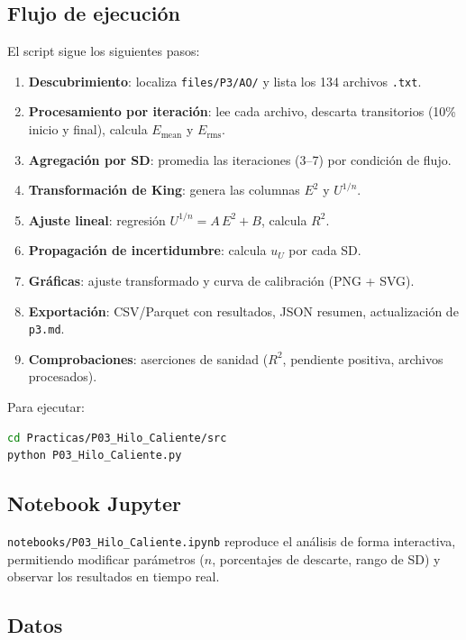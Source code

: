 \documentclass[12pt,a4paper]{article}
\begin{document}
\subsection{Flujo de ejecución}

El script sigue los siguientes pasos:

\begin{enumerate}
	\item \textbf{Descubrimiento}: localiza \texttt{files/P3/AO/} y lista
	      los 134 archivos \texttt{.txt}.
	\item \textbf{Procesamiento por iteración}: lee cada archivo, descarta
	      transitorios (10\% inicio y final), calcula $E_\mathrm{mean}$ y
	      $E_\mathrm{rms}$.
	\item \textbf{Agregación por SD}: promedia las iteraciones (3--7) por
	      condición de flujo.
	\item \textbf{Transformación de King}: genera las columnas $E^2$ y
	      $U^{1/n}$.
	\item \textbf{Ajuste lineal}: regresión $U^{1/n} = A\,E^2 + B$,
	      calcula $R^2$.
	\item \textbf{Propagación de incertidumbre}: calcula $u_U$ por cada SD.
	\item \textbf{Gráficas}: ajuste transformado y curva de calibración
	      (PNG + SVG).
	\item \textbf{Exportación}: CSV/Parquet con resultados, JSON resumen,
	      actualización de \texttt{p3.md}.
	\item \textbf{Comprobaciones}: aserciones de sanidad ($R^2$, pendiente
	      positiva, archivos procesados).
\end{enumerate}

Para ejecutar:
\begin{lstlisting}[language=bash,caption={Ejecución del script HWA.}]
cd Practicas/P03_Hilo_Caliente/src
python P03_Hilo_Caliente.py
\end{lstlisting}

\subsection{Notebook Jupyter}

\texttt{notebooks/P03\_Hilo\_Caliente.ipynb} reproduce el análisis de forma
interactiva, permitiendo modificar parámetros ($n$, porcentajes de descarte,
rango de SD) y observar los resultados en tiempo real.

\subsection{Datos}
\end{document}
